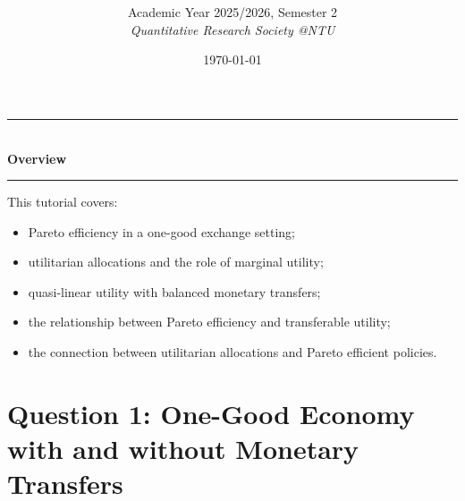 \documentclass[12pt]{article}
\title{
\CourseCode \CourseName \\[0.3em]
\large \DocType
}
\author{
  Academic Year 2025/2026, Semester 2 \\[0.25em]
  \textit{Quantitative Research Society @NTU}
}
\date{\today}
\begin{document}
\maketitle
\thispagestyle{plainfirst}
\pagestyle{main}
\bigskip

\begin{center}
  \rule{0.8\textwidth}{0.4pt}\\[4pt]
  \textbf{Overview}\\[2pt]
  \rule{0.8\textwidth}{0.4pt}
\end{center}

\noindent
This tutorial covers:
\begin{itemize}[leftmargin=*]
  \item Pareto efficiency in a one-good exchange setting;
  \item utilitarian allocations and the role of marginal utility;
  \item quasi-linear utility with balanced monetary transfers;
  \item the relationship between Pareto efficiency and transferable utility;
  \item the connection between utilitarian allocations and Pareto efficient policies.
\end{itemize}

\bigskip

\newpage
\tableofcontents

\newpage
\section{Question 1: One-Good Economy with and without Monetary Transfers}
\end{document}

